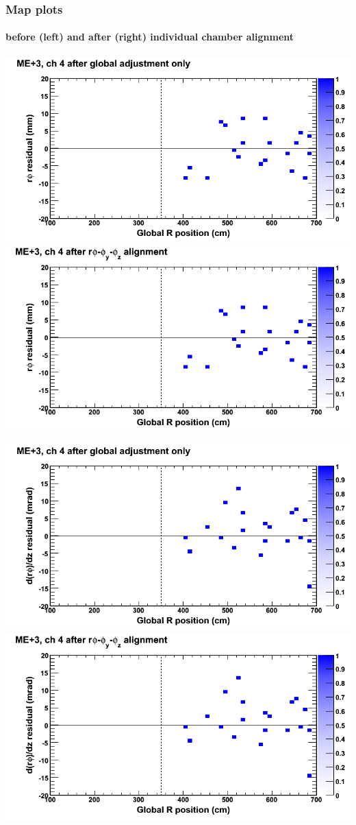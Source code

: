 \documentclass[compress]{beamer}
\begin{document}
\begin{frame}
\frametitle{Map plots}
\framesubtitle{before (left) and after (right) individual chamber alignment}
\includegraphics[width=0.5\linewidth]{ringmapplots_3dof/before_CSCvsr_mep3ch04_x.png} \includegraphics[width=0.5\linewidth]{ringmapplots_3dof/after_CSCvsr_mep3ch04_x.png}

\includegraphics[width=0.5\linewidth]{ringmapplots_3dof/before_CSCvsr_mep3ch04_dxdz.png} \includegraphics[width=0.5\linewidth]{ringmapplots_3dof/after_CSCvsr_mep3ch04_dxdz.png}
\end{frame}
\end{document}
